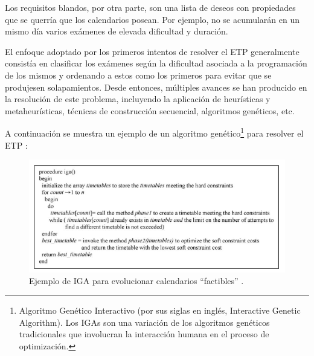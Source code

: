 Los requisitos blandos, por otra parte, son una lista de deseos con propiedades que se querría que los calendarios posean. Por ejemplo, no se acumularán en un mismo día varios exámenes de elevada dificultad y duración.\newline

El enfoque adoptado por los primeros intentos de resolver el ETP generalmente consistía en clasificar los exámenes según la dificultad asociada a la programación de los mismos y ordenando a estos como los primeros para evitar que se produjesen solapamientos. Desde entonces, múltiples avances se han producido en la resolución de este problema, incluyendo la aplicación de heurísticas y metaheurísticas, técnicas de construcción secuencial, algoritmos genéticos, etc.\newpage

A continuación se muestra un ejemplo de un algoritmo genético\footnote{Algoritmo Genético Interactivo (por sus siglas en inglés, Interactive Genetic Algorithm). Los IGAs son una variación de los algoritmos genéticos tradicionales que involucran la interacción humana en el proceso de optimización.} para resolver el ETP \cite{PILLAY2010457}:

\begin{figure}[H]
    \centering
    \includegraphics[width=1\textwidth]{./imagenes/IGA_ETP.png}
    \caption{Ejemplo de IGA para evolucionar calendarios ``factibles'' \cite{PILLAY2010457}.}
\end{figure}



